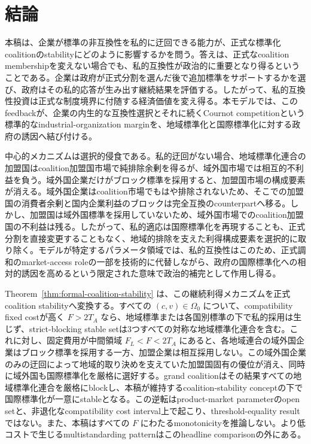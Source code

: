\section{結論}
\label{sec:conclusion}

本稿は、企業が標準の非互換性を私的に迂回できる能力が、正式な標準化coalitionのstabilityにどのように影響するかを問う。答えは、正式なcoalition membershipを変えない場合でも、私的互換性が政治的に重要となり得るということである。企業は政府が正式分割を選んだ後で追加標準をサポートするかを選び、政府はその私的応答が生み出す継続結果を評価する。したがって、私的互換性投資は正式な制度境界に付随する経済価値を変え得る。本モデルでは、このfeedbackが、企業の内生的な互換性選択とそれに続くCournot competitionという標準的なindustrial-organization marginを、地域標準化と国際標準化に対する政府の誘因へ結び付ける。

中心的メカニズムは選択的侵食である。私的迂回がない場合、地域標準化連合の加盟国はcoalition加盟国市場で純排除余剰を得るが、域外国市場では相互的不利益を負う。域外国企業だけがブロック標準を採用すると、加盟国市場の構成要素が消える。域外国企業はcoalition市場でもはや排除されないため、そこでの加盟国の消費者余剰と国内企業利益のブロックは完全互換のcounterpartへ移る。しかし、加盟国は域外国標準を採用していないため、域外国市場でのcoalition加盟国の不利益は残る。したがって、私的適応は国際標準化を再現することも、正式分割を直接変更することもなく、地域的排除を支えた利得構成要素を選択的に取り除く。モデルが特定するパラメータ領域では、私的互換性はこのため、正式調和のmarket-access roleの一部を技術的に代替しながら、政府の国際標準化への相対的誘因を高めるという限定された意味で政治的補完として作用し得る。

Theorem~\ref{thm:formal-coalition-stability} は、この継続利得メカニズムを正式coalition stabilityへ変換する。すべての $(c,v)\in\Omega_0$ について、compatibility fixed costが高く $F>2T_A$ なら、地域標準または各国別標準の下で私的採用は生じず、strict-blocking stable setは3つすべての対称な地域標準化連合を含む。これに対し、固定費用が中間領域 $F_L<F<2T_A$ にあると、各地域連合の域外国企業はブロック標準を採用する一方、加盟企業は相互採用しない。この域外国企業のみの迂回によって地域的取り決めを支えていた加盟国固有の優位が消え、同時に域外国も国際標準化を厳格に選好する。grand coalitionはその結果すべての地域標準化連合を厳格にblockし、本稿が維持するcoalition-stability conceptの下で国際標準化が一意にstableとなる。この逆転はproduct-market parameterのopen setと、非退化なcompatibility cost interval上で起こり、threshold-equality resultではない。また、本稿はすべての $F$ にわたるmonotonicityを推論しない。より低コストで生じるmultistandarding patternはこのheadline comparisonの外にある。

